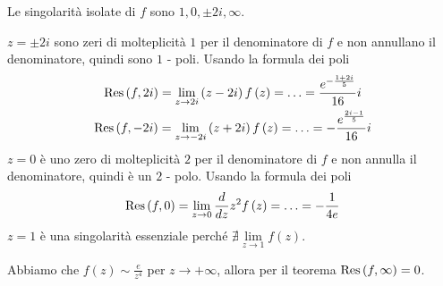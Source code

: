 Le singolarità isolate di $f$ sono $1,0,\pm 2i,\infty $.

$z = \pm 2i$ sono zeri di molteplicità $1$ per il denominatore di $f$ e non annullano il denominatore, quindi sono $1$ - poli. Usando la formula dei poli
\begin{gather*}
\operatorname{Res} \left(f,2i\right) = \lim\limits _{z\rightarrow 2i}\left(z - 2i\right) f\left(z\right) = \dotsc = \frac{e^{ - \frac{1 + 2i}{5}}}{16} i\\
\operatorname{Res} \left(f, - 2i\right) = \lim\limits _{z\rightarrow - 2i}\left(z + 2i\right) f\left(z\right) = \dotsc = - \frac{e^{\frac{2i - 1}{5}}}{16} i
\end{gather*}
$z = 0$ è uno zero di molteplicità $2$ per il denominatore di $f$ e non annulla il denominatore, quindi è un $2$ - polo. Usando la formula dei poli
\begin{equation*}
\operatorname{Res} \left(f,0\right) = \lim\limits _{z\rightarrow 0}\frac{d}{dz} z^{2} f\left(z\right) = \dotsc = - \frac{1}{4e}
\end{equation*}
$z = 1$ è una singolarità essenziale perché $\nexists \lim\limits _{z\rightarrow 1} f\left(z\right)$.

Abbiamo che $f\left(z\right) \sim \frac{e}{z^{4}}$ per $z\rightarrow + \infty $, allora per il teorema $\operatorname{Res} \left(f,\infty \right) = 0$.

